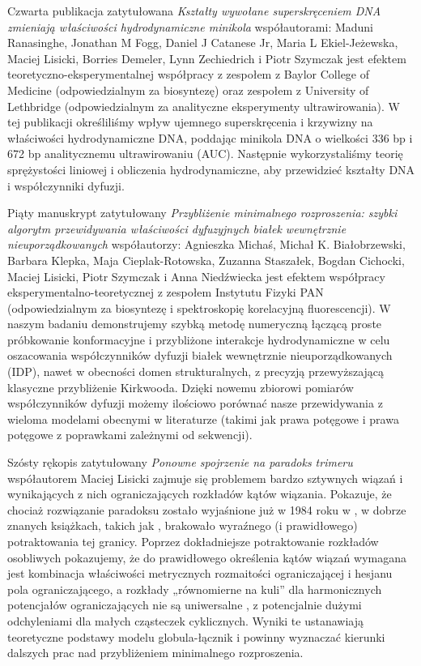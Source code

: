 \documentclass{doctoral}
\begin{document}
{    Czwarta publikacja zatytułowana \emph{Kształty wywołane superskręceniem DNA zmieniają właściwości hydrodynamiczne minikola} współautorami: Maduni Ranasinghe, Jonathan M Fogg, Daniel J Catanese Jr, Maria L Ekiel-Jeżewska, Maciej Lisicki, Borries Demeler, Lynn Zechiedrich i Piotr Szymczak jest efektem teoretyczno-eksperymentalnej współpracy z zespołem z Baylor College of Medicine (odpowiedzialnym za biosyntezę) oraz zespołem z University of Lethbridge (odpowiedzialnym za analityczne eksperymenty ultrawirowania).
    W tej publikacji określiliśmy wpływ ujemnego superskręcenia i krzywizny na właściwości hydrodynamiczne DNA, poddając minikola DNA o wielkości 336 bp i 672 bp analitycznemu ultrawirowaniu (AUC).
    Następnie wykorzystaliśmy teorię sprężystości liniowej i obliczenia hydrodynamiczne, aby przewidzieć kształty DNA i współczynniki dyfuzji.

    Piąty manuskrypt zatytułowany \emph{Przybliżenie minimalnego rozproszenia: szybki algorytm przewidywania właściwości dyfuzyjnych białek wewnętrznie nieuporządkowanych} współautorzy: Agnieszka Michaś, Michał K.
    Białobrzewski, Barbara Klepka, Maja Cieplak-Rotowska, Zuzanna Staszałek, Bogdan Cichocki, Maciej Lisicki, Piotr Szymczak i Anna Niedźwiecka jest efektem współpracy eksperymentalno-teoretycznej z zespołem Instytutu Fizyki PAN (odpowiedzialnym za biosyntezę i spektroskopię korelacyjną fluorescencji).
    W naszym badaniu demonstrujemy szybką metodę numeryczną łączącą proste próbkowanie konformacyjne i przybliżone interakcje hydrodynamiczne w celu oszacowania współczynników dyfuzji białek wewnętrznie nieuporządkowanych (IDP), nawet w obecności domen strukturalnych, z precyzją przewyższającą klasyczne przybliżenie Kirkwooda.
    Dzięki nowemu zbiorowi pomiarów współczynników dyfuzji możemy ilościowo porównać nasze przewidywania z wieloma modelami obecnymi w literaturze (takimi jak prawa potęgowe i prawa potęgowe z poprawkami zależnymi od sekwencji).

    Szósty rękopis zatytułowany \emph{Ponowne spojrzenie na paradoks trimeru} współautorem Maciej Lisicki zajmuje się problemem bardzo sztywnych wiązań i wynikających z nich ograniczających rozkładów kątów wiązania.
    Pokazuje, że chociaż rozwiązanie paradoksu zostało wyjaśnione już w 1984 roku w \textcite{van_Kampen_1984}, w dobrze znanych książkach, takich jak \textcite{Frenkel_2002}, brakowało wyraźnego (i prawidłowego) potraktowania tej granicy.
    Poprzez dokładniejsze potraktowanie rozkładów osobliwych pokazujemy, że do prawidłowego określenia kątów wiązań wymagana jest kombinacja właściwości metrycznych rozmaitości ograniczającej i hesjanu pola ograniczającego, a rozkłady „równomierne na kuli” dla harmonicznych potencjałów ograniczających nie są uniwersalne , z potencjalnie dużymi odchyleniami dla małych cząsteczek cyklicznych.
    Wyniki te ustanawiają teoretyczne podstawy modelu globula-łącznik i powinny wyznaczać kierunki dalszych prac nad przybliżeniem minimalnego rozproszenia.

}
\end{document}
